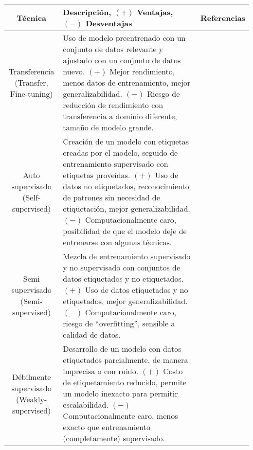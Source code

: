 \begin{center}
    \vspace{-\topsep}
    \begin{table}[h!]
        \footnotesize
        \begin{tabular}{ |c|m{9.5cm}|c| }
            \hline
            \bf Técnica & \bf Descripción, $(+)$ Ventajas, $(-)$ Desventajas & \bf Referencias \\
            \hline
            \makecell{Transferencia \\ (Transfer, Fine-tuning)} & Uso de modelo preentrenado con un conjunto de datos
            relevante y ajustado con un conjunto de datos nuevo. $(+)$ Mejor rendimiento, menos datos de entrenamiento,
            mejor generalizabilidad. $(-)$ Riesgo de reducción de rendimiento con transferencia a dominio diferente,
            tamaño de modelo grande. & \makecell{\autocite{safonova-2023,maggiori-2016-0,castelluccio-2015} \\
            \autocite{nogueira-2017,zhong-2016,amato-2023}} \\
            \hline
            \makecell{Auto supervisado \\ (Self-supervised)} & Creación de un modelo con etiquetas creadas por el
            modelo, seguido de entrenamiento supervisado con etiquetas proveídas. $(+)$ Uso de datos no etiquetados,
            reconocimiento de patrones sin necesidad de etiquetación, mejor generalizabilidad. $(-)$ Computacionalmente
            caro, posibilidad de que el modelo deje de entrenarse con algunas técnicas. & \autocite{safonova-2023} \\
            \hline
            \makecell{Semi supervisado \\ (Semi-supervised)} & Mezcla de entrenamiento supervisado y no supervisado con
            conjuntos de datos etiquetados y no etiquetados. $(+)$ Uso de datos etiquetados y no etiquetados, mejor
            generalizabilidad. $(-)$ Computacionalmente caro, riesgo de \enquote{overfitting}, sensible a calidad de
            datos. & \autocite{safonova-2023} \\
            \hline
            \makecell{Débilmente supervisado \\ (Weakly-supervised)} & Desarrollo de un modelo con datos etiquetados
            parcialmente, de manera imprecisa o con ruido. $(+)$ Costo de etiquetamiento reducido, permite un modelo
            inexacto para permitir escalabilidad. $(-)$ Computacionalmente caro, menos exacto que entrenamiento
            (completamente) supervisado. & \autocite{safonova-2023} \\

\end{tabular}
\end{table}
\end{center}
